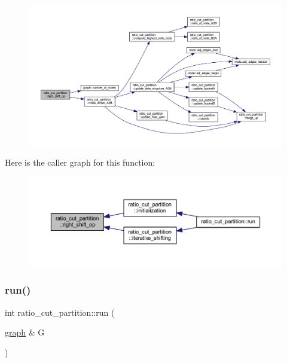 \begin{figure}[H]
\begin{center}
\leavevmode
\includegraphics[width=350pt]{classratio__cut__partition_a9b2ac474cfdeabd8a2c5cb42fcc97d26_cgraph}
\end{center}
\end{figure}
Here is the caller graph for this function\+:\nopagebreak
\begin{figure}[H]
\begin{center}
\leavevmode
\includegraphics[width=350pt]{classratio__cut__partition_a9b2ac474cfdeabd8a2c5cb42fcc97d26_icgraph}
\end{center}
\end{figure}
\mbox{\label{classratio__cut__partition_a4ab180ca4cf57c811e3478c3de4c4dc3}} 
\subsubsection{\texorpdfstring{run()}{run()}}
{\footnotesize\ttfamily int ratio\+\_\+cut\+\_\+partition\+::run (\begin{DoxyParamCaption}\item[{\mbox{\hyperlink{classgraph}{graph}} \&}]{G }\end{DoxyParamCaption})\hspace{0.3cm}{\ttfamily [virtual]}}

